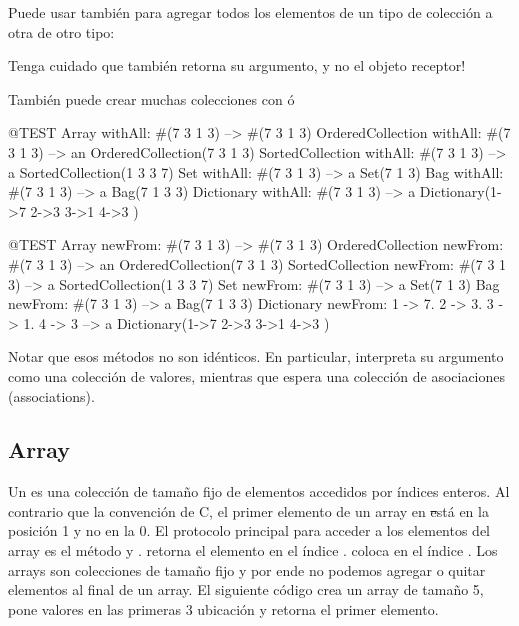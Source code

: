 \documentclass[a4paper,10pt,twoside]{book}
\begin{document}
Puede usar tambi\'en  para agregar todos los elementos de un tipo de colecci\'on a otra de otro tipo:

\noindent
Tenga cuidado que  tambi\'en retorna su argumento, y no el objeto receptor!

Tambi\'en puede crear muchas colecciones con  \'o 

\begin{code}{@TEST}
Array withAll: #(7 3 1 3)                      --> #(7 3 1 3)
OrderedCollection withAll: #(7 3 1 3) --> an OrderedCollection(7 3 1 3)
SortedCollection withAll: #(7 3 1 3)    --> a SortedCollection(1 3 3 7)
Set withAll: #(7 3 1 3)                         --> a Set(7 1 3)
Bag withAll: #(7 3 1 3)                        --> a Bag(7 1 3 3)
Dictionary withAll: #(7 3 1 3)               --> a Dictionary(1->7 2->3 3->1 4->3 )
\end{code}

\begin{code}{@TEST}
Array newFrom: #(7 3 1 3)                                          --> #(7 3 1 3)
OrderedCollection newFrom: #(7 3 1 3)                     --> an OrderedCollection(7 3 1 3)
SortedCollection newFrom: #(7 3 1 3)                       --> a SortedCollection(1 3 3 7)
Set newFrom: #(7 3 1 3)                                            --> a Set(7 1 3)
Bag newFrom: #(7 3 1 3)                                           --> a Bag(7 1 3 3)
Dictionary newFrom: {1 -> 7. 2 -> 3. 3 -> 1. 4 -> 3} --> a Dictionary(1->7 2->3 3->1 4->3 )
\end{code}
\noindent
Notar que esos m\'etodos no son id\'enticos.
En particular,  interpreta su argumento como una colecci\'on de valores, mientras que  espera una colecci\'on de asociaciones (associations).

\subsection{Array}
Un  es una colecci\'on de tama\~{n}o fijo de elementos accedidos por \'indices enteros.
Al contrario que la convenci\'on de C, el primer elemento de un array en \st est\'a en la posici\'on 1 y no en la 0. 
El protocolo principal para acceder a los elementos del array es el m\'etodo  y .  retorna el elemento en el \'indice .  coloca  en el \'indice . Los arrays son colecciones de tama\~{n}o fijo y por ende no podemos agregar o quitar elementos al final de un array. El siguiente c\'odigo crea un array de tama\~{n}o 5, pone valores en las primeras 3 ubicaci\'on y retorna el primer elemento. 
\end{document}
